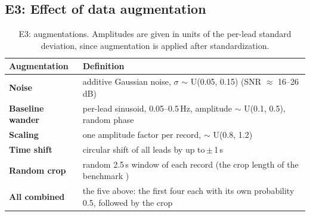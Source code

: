 \documentclass{article}
\begin{document}
\subsection{E3: Effect of data augmentation}

\begin{table}[htb]
  \caption{E3: augmentations. Amplitudes are given in units of the per-lead standard deviation, since augmentation is applied after standardization.}
  \label{tab:e3aug}
  \centering\footnotesize
  \begin{tabularx}{\linewidth}{lX}
    \toprule
    Augmentation & Definition \\
    \midrule
    \textbf{Noise} & additive Gaussian noise, $\sigma$ $\sim$ U(0.05, 0.15) (SNR $\approx$ 16--26 dB) \\
    \textbf{Baseline wander} & per-lead sinusoid, 0.05--0.5\,Hz, amplitude $\sim$ U(0.1, 0.5), random phase \\
    \textbf{Scaling} & one amplitude factor per record, $\sim$ U(0.8, 1.2) \\
    \textbf{Time shift} & circular shift of all leads by up to\,$\pm$\,1\,s \\
    \textbf{Random crop} & random 2.5\,s window of each record (the crop length of the benchmark \citep{strodthoff2021}) \\
    \textbf{All combined} & the five above: the first four each with its own probability 0.5, followed by the crop \\
    \bottomrule
  \end{tabularx}
\end{table}
\end{document}
